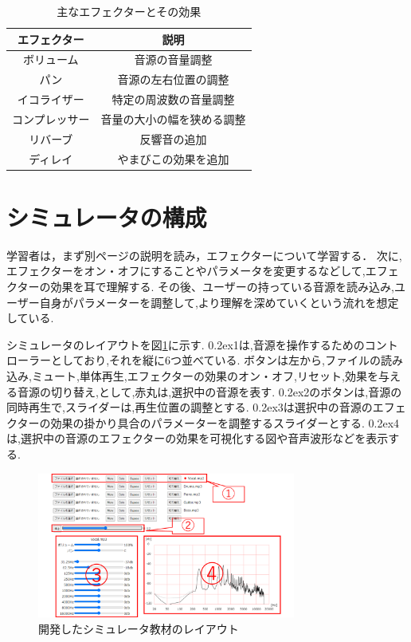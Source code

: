 \documentclass[twocolumn,10pt,a4j]{ltjsarticle}
\begin{document}
\begin{table}[h]
  \centering
  \caption{主なエフェクターとその効果}
  \label{table:effector}
  \small
  \begin{tabular}{cc}
    \hline
    エフェクター  & 説明    \\
    \hline \hline
    ボリューム  & 音源の音量調整 \\
    \hline
    パン  & 音源の左右位置の調整 \\
    \hline
    イコライザー  &  特定の周波数の音量調整 \\
    \hline
    コンプレッサー  &  音量の大小の幅を狭める調整 \\
    \hline
    リバーブ &  反響音の追加 \\
    \hline
    ディレイ  &  やまびこの効果を追加 \\
    \hline
  \end{tabular}
\end{table}

\section{シミュレータの構成}
学習者は，まず別ページの説明を読み，エフェクターについて学習する．
次に,エフェクターをオン・オフにすることやパラメータを変更するなどして,エフェクターの効果を耳で理解する.
その後、ユーザーの持っている音源を読み込み,ユーザー自身がパラメーターを調整して,より理解を深めていくという流れを想定している.

シミュレータのレイアウトを図\ref{fig:layout}に示す.
\raise0.2ex\hbox{\textcircled{\scriptsize{1}}}は,音源を操作するためのコントローラーとしており,それを縦に6つ並べている.
ボタンは左から,ファイルの読み込み,ミュート,単体再生,エフェクターの効果のオン・オフ,リセット,効果を与える音源の切り替え,として,赤丸は,選択中の音源を表す.
\raise0.2ex\hbox{\textcircled{\scriptsize{2}}}のボタンは,音源の同時再生で,スライダーは,再生位置の調整とする.
\raise0.2ex\hbox{\textcircled{\scriptsize{3}}}は選択中の音源のエフェクターの効果の掛かり具合のパラメーターを調整するスライダーとする.
\raise0.2ex\hbox{\textcircled{\scriptsize{4}}}は,選択中の音源のエフェクターの効果を可視化する図や音声波形などを表示する.

\begin{figure}[h]
\centering
 \includegraphics[width=85mm]{./figures/layout.pdf}
 \caption{開発したシミュレータ教材のレイアウト}
 \label{fig:layout}
\end{figure}
\end{document}
